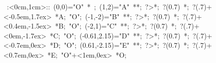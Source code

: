 
%

\hbox{
\xy    <1cm,0cm>:<0cm,1cm>::
       (0,0)="O" *{\bullet}  ; (1,2)="A" **\dir{-}; ?>*\dir{>};
          ?(0.7) *{\bullet};
          ?(.7)+<-0.5em,1.7ex> *{A};
       "O"; (-1,-2)="B" **\dir{-}; ?>*\dir{>}; ?(0.7) *{\bullet};
          ?(.7)+<0.4em,-1.5ex> *{B};
       "O"; (-2,1)="C" **\dir{-}; ?>*\dir{>}; ?(0.7) *{\bullet};
          ?(.7)+<0em,-1.7ex> *{C};
       "O"; (-0.61,2.15)="D" **\dir{-}; ?>*\dir{>}; ?(0.7) *{\bullet};
          ?(.7)+<-0.7em,0ex> *{D};
       "O"; (0.61,-2.15)="E" **\dir{-}; ?>*\dir{>}; ?(0.7) *{\bullet};
          ?(.7)+<0.7em,0ex> *{E};
       "O"+<1em,0ex> *{O};
       \endxy}


